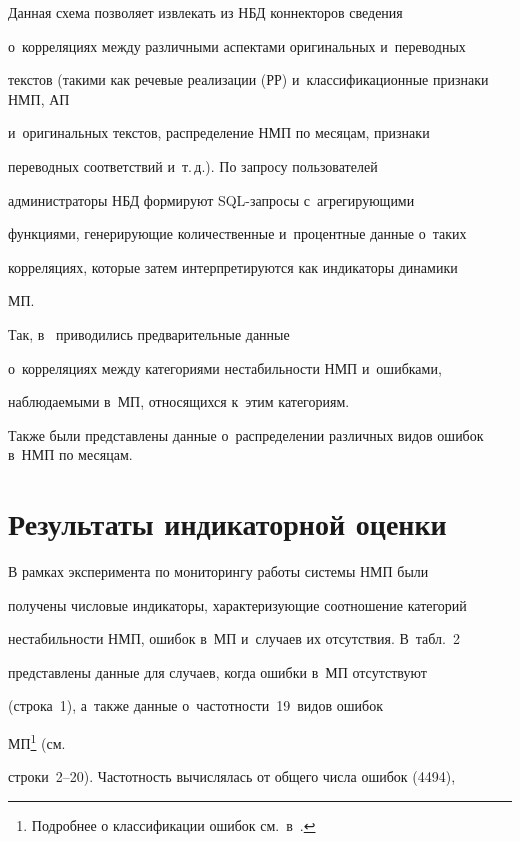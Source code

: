      Данная схема позволяет извлекать из НБД коннекторов сведения 


о~корреляциях между различными аспектами оригинальных и~переводных 


текс\-тов (такими как речевые реализации (РР) и~классификационные признаки НМП, АП 


и~оригинальных текс\-тов, распределение НМП по месяцам, признаки 


переводных соответствий и~т.\,д.). По запросу пользователей 


администраторы НБД формируют SQL-за\-про\-сы с~агрегирующими 


функциями, ге\-не\-ри\-ру\-ющие количественные и~процентные данные о~таких 


корреляциях, которые затем интерпретируются как индикаторы динамики 


МП.


     


     Так, в~\cite{17-ez} приводились предварительные данные 


о~корреляциях между категориями нестабильности НМП и~ошибками, 


наблюдаемыми в~МП, относящихся к~этим категориям. 


Также были пред\-став\-ле\-ны данные о~распределении различных видов ошибок в~НМП по месяцам.





\section{Результаты индикаторной оценки}


   


   В рамках эксперимента по мониторингу работы системы НМП были 


получены числовые индикаторы, ха\-рак\-те\-ри\-зу\-ющие соотношение категорий 


не\-ста\-биль\-ности НМП, ошибок в~МП и~случаев их отсутствия. В~табл.~2 


пред\-став\-ле\-ны данные для случаев, когда ошибки в~МП отсутствуют 


(строка~1), а~также данные о~час\-тот\-ности~19~видов ошибок 


МП\footnote{Подробнее о классификации ошибок см.\ в~\cite{6-ez, 16-ez}.} (см.\ 


строки~2--20). Час\-тот\-ность вы\-чис\-ля\-лась от общего чис\-ла ошибок (4494), 


